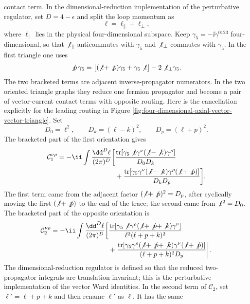 contact term.  In the dimensional-reduction implementation of the perturbative
regulator, set \(D=4-\epsilon\) and split the loop momentum as
\[
  \ell=\ell_\parallel+\ell_\perp ,
\]
where \(\ell_\parallel\) lies in the physical four-dimensional subspace.
Keep \(\gamma_5=-\ii\gamma^{0123}\) four-dimensional, so that
\(\not\ell_\parallel\) anticommutes with \(\gamma_5\) and
\(\not\ell_\perp\) commutes with \(\gamma_5\).  In the first triangle one uses
\[
  \not p\,\gamma_5
  =
  \bigl[(\not\ell+\not p)\gamma_5+\gamma_5\not\ell\bigr]
  -2\not\ell_\perp\gamma_5 .
\]
The two bracketed terms are adjacent inverse-propagator numerators.  In the two
oriented triangle graphs they reduce one fermion propagator and become a pair of
vector-current contact terms with opposite routing.  Here is the cancellation
explicitly for the leading routing in Figure
\ref{fig:four-dimensional-axial-vector-vector-triangle}.  Set
\[
  D_0=\ell^2,\qquad
  D_k=(\ell-k)^2,\qquad
  D_p=(\ell+p)^2 .
\]
The bracketed part of the first orientation gives
\[
\begin{aligned}
  \mathcal C^{\nu\rho}_1
  =
  -\ii\int\frac{\dd^D\ell}{(2\pi)^D}
  \bigg[
  &
  \frac{
    \operatorname{tr}\!\left[
      \gamma_5\not\ell\gamma^\nu(\not\ell-\not k)\gamma^\rho
    \right]
  }{D_0D_k}
\\
  &+
  \frac{
    \operatorname{tr}\!\left[
      \gamma_5\gamma^\nu(\not\ell-\not k)\gamma^\rho(\not\ell+\not p)
    \right]
  }{D_kD_p}
  \bigg].
\end{aligned}
\]
The first term came from the adjacent factor
\((\not\ell+\not p)^2=D_p\), after cyclically moving the first
\((\not\ell+\not p)\) to the end of the trace; the second came from
\(\not\ell^2=D_0\).  The bracketed part of the opposite orientation is
\[
\begin{aligned}
  \mathcal C^{\nu\rho}_2
  =
  -\ii\int\frac{\dd^D\ell}{(2\pi)^D}
  \bigg[
  &
  \frac{
    \operatorname{tr}\!\left[
      \gamma_5\not\ell\gamma^\rho
      (\not\ell+\not p+\not k)\gamma^\nu
    \right]
  }{\ell^2(\ell+p+k)^2}
\\
  &+
  \frac{
    \operatorname{tr}\!\left[
      \gamma_5\gamma^\rho
      (\not\ell+\not p+\not k)\gamma^\nu(\not\ell+\not p)
    \right]
  }{(\ell+p+k)^2D_p}
  \bigg].
\end{aligned}
\]
The dimensional-reduction regulator is defined so that the reduced
two-propagator integrals are translation invariant; this is the perturbative
implementation of the vector Ward identities.  In the second term of
\(\mathcal C_2\), set
\(\ell'=\ell+p+k\) and then rename \(\ell'\) as \(\ell\).  It has the same
